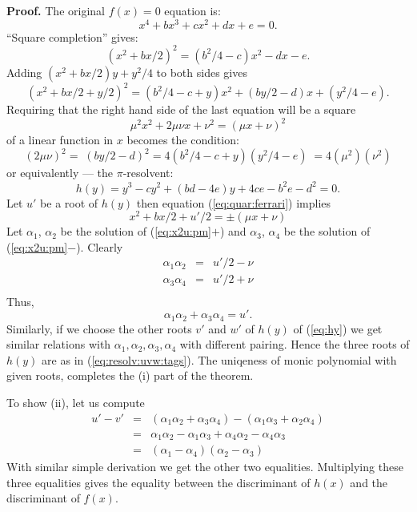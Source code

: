 \textbf{Proof.}
The original \(f(x)=0\) equation is:
\begin{equation*}
x^4 + bx^3 + cx^2 + dx + e = 0.
\end{equation*}
``Square completion'' gives:
\begin{equation*}
(x^2 + bx/2)^2 = (b^2/4-c)x^2 - dx - e.
\end{equation*}
Adding \((x^2+bx/2)y + y^2/4\) to both sides gives
\begin{equation} \label{eq:quar:ferrari}
(x^2 + bx/2+y/2)^2 = (b^2/4 -c + y)x^2 + (by/2-d)x + (y^2/4 - e).
\end{equation}
Requiring that the right hand side of the last equation
will be a square
\begin{equation*}
  \mu^2x^2 + 2\mu\nu x + \nu^2 = (\mu x + \nu)^2
\end{equation*}
of a linear function in $x$ becomes
the condition:
\begin{equation*}
(2\mu\nu)^2 =\; (by/2-d)^2 = 4(b^2/4 -c + y)(y^2/4 - e) \;= 4(\mu^2)(\nu^2)
\end{equation*}
or equivalently --- the \(\pi\)-resolvent:
\begin{equation} \label{eq:hy}
h(y) =  y^3 - cy^2 + (bd - 4e)y + 4ce - b^2e - d^2 = 0.
\end{equation}
Let $u'$ be a root of \(h(y)\)
then equation (\ref{eq:quar:ferrari}) implies
\begin{equation} \label{eq:x2u:pm}
x^2 + bx/2+u'/2 = \pm(\mu x + \nu)
\end{equation}
Let \(\alpha_1\), \(\alpha_2\) be the solution of (\ref{eq:x2u:pm}$+$)
and \(\alpha_3\), \(\alpha_4\) be the solution of (\ref{eq:x2u:pm}$-$).
Clearly
\begin{eqnarray*}
\alpha_1 \alpha_2 & = & u'/2 - \nu \\
\alpha_3 \alpha_4 & = & u'/2 + \nu \\
\end{eqnarray*}
Thus,
\begin{equation*}
 \alpha_1 \alpha_2 + \alpha_3 \alpha_4 = u'.
\end{equation*}
Similarly, if we choose the other
roots $v'$ and $w'$ of \(h(y)\) of (\ref{eq:hy})
we get similar relations with \(\alpha_1,\alpha_2,\alpha_3,\alpha_4\)
with different pairing.
Hence the three roots of \(h(y)\) are as in (\ref{eq:resolv:uvw:tags}).
The uniqeness of monic polynomial with given roots, completes
the (i) part of the theorem.

To show (ii), let us compute
\begin{eqnarray*}
u' - v'
 & = &   (\alpha_1 \alpha_2 + \alpha_3 \alpha_4)
       - (\alpha_1 \alpha_3 + \alpha_2 \alpha_4) \\
 & = &     \alpha_1 \alpha_2 - \alpha_1 \alpha_3
         + \alpha_4 \alpha_2 - \alpha_4 \alpha_3 \\
 & = &   (\alpha_1 - \alpha_4)(\alpha_2 - \alpha_3)
\end{eqnarray*}
With similar simple derivation we get  the other two equalities.
Multiplying these three equalities gives the equality 
between the discriminant of \(h(x)\)
and the discriminant of \(f(x)\).

